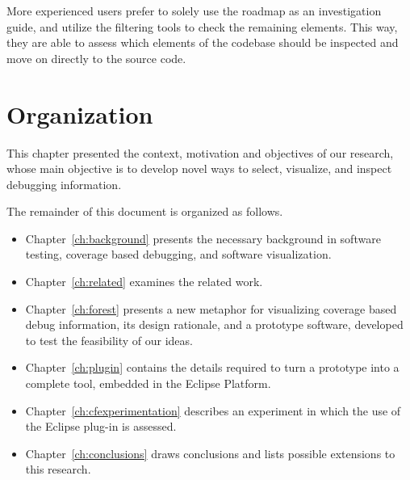 More experienced users prefer to solely use the roadmap as an investigation
guide, and utilize the filtering tools to check the remaining elements. This
way, they are able to assess which elements of the codebase should be inspected
and move on directly to the source code.

\section{Organization}

This chapter presented the context, motivation and objectives of our research,
whose main objective is to develop novel ways to select, visualize, and inspect
debugging information.

The remainder of this document is organized as follows.
\begin{itemize}
  \item Chapter~\ref{ch:background} presents the necessary background in
  software testing, coverage based debugging, and software visualization.
  \item Chapter~\ref{ch:related} examines the related work.
  \item Chapter~\ref{ch:forest} presents a new metaphor for visualizing coverage
  based debug information, its design rationale, and a prototype software,
  developed to test the feasibility of our ideas.
  \item Chapter~\ref{ch:plugin} contains the details required to turn a
  prototype into a complete tool, embedded in the Eclipse Platform.
  \item Chapter~\ref{ch:cfexperimentation} describes an experiment in which the
  use of the Eclipse plug-in is assessed.
  \item Chapter~\ref{ch:conclusions} draws conclusions and lists possible
  extensions to this research.
\end{itemize}